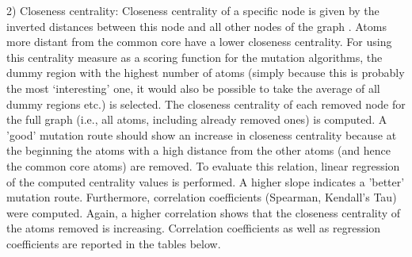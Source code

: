 2) Closeness centrality: Closeness centrality of a specific node is
given by the inverted distances between this node and all other nodes
of the graph \cite{Newman.2010}. Atoms more distant from the common core have a lower
closeness centrality.
For using this centrality measure as a scoring function for the mutation
algorithms, the dummy region with the highest number of atoms (simply
because this is probably the most \textquoteleft interesting\textquoteright{}
one, it would also be possible to take the average of all dummy regions
etc.) is selected. The closeness centrality of each removed node for
the full graph (i.e., all atoms, including already removed ones) is
computed. A 'good' mutation route should show an increase in closeness
centrality because at the beginning the atoms with a high distance
from the other atoms (and hence the common core atoms) are removed.
To evaluate this relation, linear regression of the computed centrality
values is performed. A higher slope indicates a 'better' mutation
route. Furthermore, correlation coefficients (Spearman, Kendall's
Tau) were computed. Again, a higher correlation shows that the
closeness centrality of the atoms removed is increasing. Correlation
coefficients as well as regression coefficients are reported in the
tables below.

